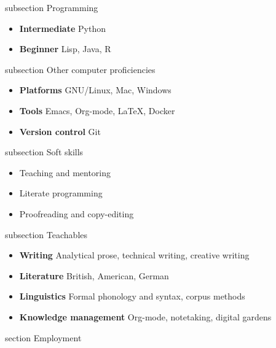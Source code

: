 \documentclass[10pt]{article}
\newcommand{\sectionhead}[1]{%
\begin{bgbox}{section}%
{\Large \textsf{#1}}%
\end{bgbox}%
}
\newcommand{\subsectionhead}[1]{%
\begin{bgbox}{subsection}%
{\small \textsf{#1}}%
\end{bgbox}%
}
\begin{document}
\begin{sloppypar}
\begin{paracol}{2}
\begin{raggedright}
\subsectionhead{Programming}
\label{Programming}
\begin{itemize}
\item \textbf{Intermediate} Python
\item \textbf{Beginner} Lisp, Java, R
\end{itemize}

\subsectionhead{Other computer proficiencies}
\label{Other-computer-proficiencies}
\begin{itemize}
\item \textbf{Platforms} GNU/Linux, Mac, Windows
\item \textbf{Tools} Emacs, Org-mode, \LaTeX, Docker
\item \textbf{Version control} Git
\end{itemize}

\subsectionhead{Soft skills}
\label{Soft-skills}
\begin{itemize}
\item Teaching and mentoring
\item Literate programming
\item Proofreading and copy-editing
\end{itemize}

\subsectionhead{Teachables}
\label{Teachables}
\begin{itemize}
\item \textbf{Writing} Analytical prose, technical writing, creative writing
\item \textbf{Literature} British, American, German
\item \textbf{Linguistics} Formal phonology and syntax, corpus methods
\item \textbf{Knowledge management} Org-mode, notetaking, digital gardens
\end{itemize}

\end{raggedright}
\switchcolumn %


\sectionhead{Employment}
\label{Employment}
\small


\end{paracol}
\end{sloppypar}
\end{document}
